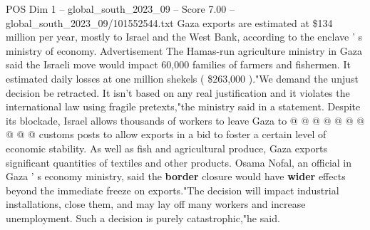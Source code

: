 \begin{textsample}{POS Dim 1 – global\_south\_2023\_09 – Score 7.00 – global\_south\_2023\_09/101552544.txt}
Gaza exports are estimated at \$134 million per year, mostly to Israel and the West Bank, according to the enclave ' s ministry of economy.
Advertisement The Hamas-run agriculture ministry in Gaza said the Israeli move would impact 60,000 families of farmers and fishermen.
It estimated daily losses at one million shekels ( \$263,000 )."We demand the unjust decision be retracted.
It isn't based on any real justification and it violates the international law using fragile pretexts,"the ministry said in a statement.
Despite its blockade, Israel allows thousands of workers to leave Gaza to @ @ @ @ @ @ @ @ @ @ customs posts to allow exports in a bid to foster a certain level of economic stability.
As well as fish and agricultural produce, Gaza exports significant quantities of textiles and other products.
Osama Nofal, an official in Gaza ' s economy ministry, said the \textbf{border} closure would have \textbf{wider} effects beyond the immediate freeze on exports."The decision will impact industrial installations, close them, and may lay off many workers and increase unemployment.
Such a decision is purely catastrophic,"he said.

\end{textsample}
